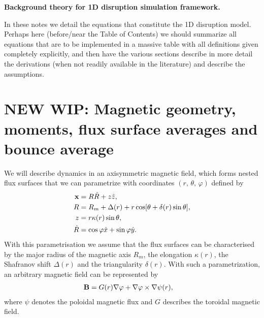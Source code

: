 \documentclass[11pt,a4paper]{article}
\renewcommand{\b}[1]{\ensuremath{ {\bf #1 } }}
\begin{document}
\begin{center}
\Large \bf Background theory for 1D disruption simulation framework.
\end{center}

\vspace{10mm}

In these notes we detail the equations that constitute the 1D disruption model. Perhaps here (before/near the Table of Contents) we should summarize all equations that are to be implemented in a massive table with all definitions given completely explicitly, and then have the various sections describe in more detail the derivations (when not readily available in the literature) and describe the assumptions.


\tableofcontents



\section{NEW WIP: Magnetic geometry, moments, flux surface averages and bounce average}
We will describe dynamics in an axisymmetric magnetic field, which forms nested flux surfaces that we can parametrize with coordinates $(r,\,\theta,\,\varphi)$ defined by
\begin{align}
\b{x} &= R\hat{R} + z\hat{z}, \nonumber \\
R &= R_m + \Delta(r) + r\cos[\theta +\delta(r) \sin\theta], \nonumber \\
z &= r \kappa(r) \sin\theta, \nonumber \\
\hat{R} &= \cos\varphi \hat{x} + \sin\varphi \hat{y}.
\label{eq:geometry coordinates}
\end{align}
With this parametrisation we assume that the flux surfaces can be characterised by the major radius of the magnetic axis $R_m$, the elongation $\kappa(r)$, the Shafranov shift $\Delta(r)$ and the triangularity $\delta(r)$.
With such a parametrization, an arbitrary magnetic field can be represented by
\begin{align}
\b{B} &= G(r) \nabla \varphi + \nabla \varphi \times \nabla \psi(r),
\end{align}
where $\psi$ denotes the poloidal magnetic flux and $G$ describes the toroidal magnetic field.
\end{document}
